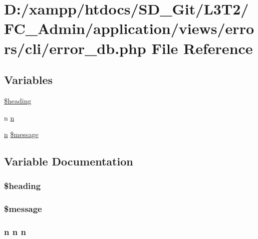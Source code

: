 \hypertarget{cli_2error__db_8php}{}\section{D\+:/xampp/htdocs/\+S\+D\+\_\+\+Git/\+L3\+T2/\+F\+C\+\_\+\+Admin/application/views/errors/cli/error\+\_\+db.php File Reference}
\label{cli_2error__db_8php}
\subsection*{Variables}
\begin{DoxyCompactItemize}
\item 
\hyperlink{cli_2error__db_8php_a196169be7715d466e3310388b096598c}{\$heading}
\item 
n \hyperlink{cli_2error__db_8php_ace0fd03cd383f20ce6ea63247a207294}{n}
\item 
\hyperlink{cli_2error__general_8php_ace0fd03cd383f20ce6ea63247a207294}{n} \hyperlink{cli_2error__db_8php_aaba2b6aee423b3b5e46000f90b4c8c7f}{\$message}
\end{DoxyCompactItemize}


\subsection{Variable Documentation}
\hypertarget{cli_2error__db_8php_a196169be7715d466e3310388b096598c}{}
\subsubsection[{\$heading}]{\setlength{\rightskip}{0pt plus 5cm}\$heading}\label{cli_2error__db_8php_a196169be7715d466e3310388b096598c}
\hypertarget{cli_2error__db_8php_aaba2b6aee423b3b5e46000f90b4c8c7f}{}
\subsubsection[{\$message}]{ \$message}\label{cli_2error__db_8php_aaba2b6aee423b3b5e46000f90b4c8c7f}
\hypertarget{cli_2error__db_8php_ace0fd03cd383f20ce6ea63247a207294}{}
\subsubsection[{n}]{\setlength{\rightskip}{0pt plus 5cm}n n n}\label{cli_2error__db_8php_ace0fd03cd383f20ce6ea63247a207294}

